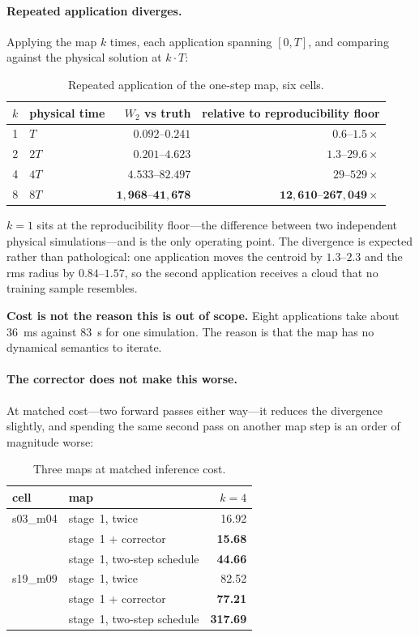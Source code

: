 ﻿\documentclass[11pt,a4paper]{article}
\newcommand{\Wtwo}{W_2}
\begin{document}
\paragraph{Repeated application diverges.} Applying the map $k$ times, each application spanning
$[0,T]$, and comparing against the physical solution at $k\cdot T$:

\begin{table}[h]
\centering\small
\begin{tabular}{@{}rlrr@{}}
\toprule
$k$ & physical time & $\Wtwo$ vs truth & relative to reproducibility floor \\
\midrule
1 & $T$ & $0.092$--$0.241$ & $\mathbf{0.6}$--$\mathbf{1.5\times}$ \\
2 & $2T$ & $0.201$--$4.623$ & $1.3$--$29.6\times$ \\
4 & $4T$ & $4.533$--$82.497$ & $29$--$529\times$ \\
8 & $8T$ & $\mathbf{1{,}968}$--$\mathbf{41{,}678}$ &
  $\mathbf{12{,}610}$--$\mathbf{267{,}049\times}$ \\
\bottomrule
\end{tabular}
\caption{Repeated application of the one-step map, six cells.}
\end{table}

$k=1$ sits at the reproducibility floor---the difference between two independent physical
simulations---and is the only operating point. The divergence is expected rather than pathological:
one application moves the centroid by $1.3$--$2.3$ and the rms radius by $0.84$--$1.57$, so the
second application receives a cloud that no training sample resembles.

\textbf{Cost is not the reason this is out of scope.} Eight applications take about
\SI{36}{\milli\second} against \SI{83}{\second} for one simulation. The reason is that the map has
no dynamical semantics to iterate.

\paragraph{The corrector does not make this worse.} At matched cost---two forward passes either
way---it reduces the divergence slightly, and spending the same second pass on another map step is
an order of magnitude worse:

\begin{table}[h]
\centering\small
\begin{tabular}{@{}llr@{}}
\toprule
cell & map & $k{=}4$ \\
\midrule
s03\_m04 & stage~1, twice & 16.92 \\
 & stage~1 + corrector & \textbf{15.68} \\
 & stage~1, two-step schedule & \textbf{44.66} \\
\midrule
s19\_m09 & stage~1, twice & 82.52 \\
 & stage~1 + corrector & \textbf{77.21} \\
 & stage~1, two-step schedule & \textbf{317.69} \\
\bottomrule
\end{tabular}
\caption{Three maps at matched inference cost.}
\end{table}
\end{document}
